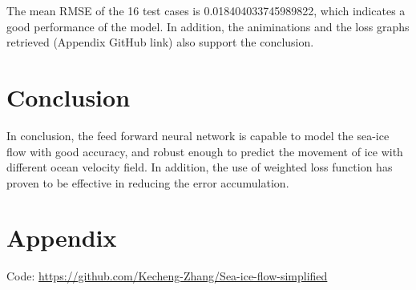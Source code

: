 \documentclass[12pt, a4paper]{article}
\begin{document}
The mean RMSE of the 16 test cases is 0.018404033745989822, which indicates a good performance of the model. In addition, the animinations and the loss graphs retrieved (Appendix GitHub link) also support the conclusion.

\section{Conclusion}
In conclusion, the feed forward neural network is capable to model the sea-ice flow with good accuracy, and robust enough to predict the movement of ice with different ocean velocity field. In addition, the use of weighted loss function has proven to be effective in reducing the error accumulation.

\newpage
\section{Appendix}
Code: 
\href{https://github.com/Kecheng-Zhang/Sea-ice-flow-simplified}{https://github.com/Kecheng-Zhang/Sea-ice-flow-simplified}
\end{document}
